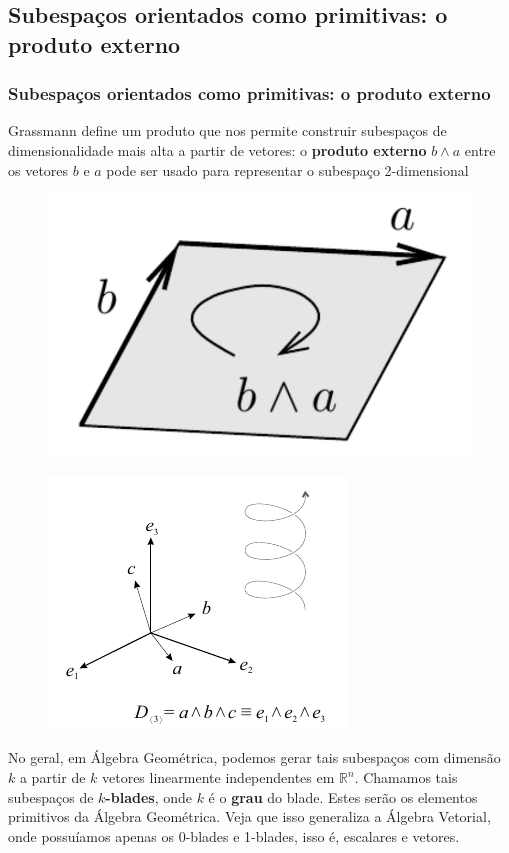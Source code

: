 \documentclass[10pt]{beamer}
\theoremstyle{plain}
\theoremstyle{definition}
\begin{document}
	\subsection{Subespaços orientados como primitivas: o produto externo}
	\begin{frame}
		\frametitle{Subespaços orientados como primitivas: o produto externo}
		
		Grassmann define um produto que nos permite construir subespaços de dimensionalidade mais alta a partir de vetores:
		o \textbf{produto externo} $b\wedge a$ entre os vetores $b$ e $a$ pode ser usado para representar o subespaço 2-dimensional
		\begin{figure}[H]
			\vspace{0.5cm}
			\hspace{-5cm}
			\includegraphics[width=0.3\linewidth]{figures/2blade2.pdf}
		\end{figure}
	
		\vspace{-3cm}
		\begin{figure}[H]
			\hspace{5cm}
			\includegraphics[width=0.3\linewidth]{figures/d3.png}
		\end{figure}
	
		No geral, em Álgebra Geométrica, podemos gerar tais subespaços com dimensão $k$ a partir de $k$ vetores linearmente independentes em $\mathbb{R}^n$. Chamamos tais subespaços de \textbf{$k$-blades}, onde $k$ é o \textbf{grau} do blade. Estes serão os elementos primitivos da Álgebra Geométrica. Veja que isso generaliza a Álgebra Vetorial, onde possuíamos apenas os 0-blades e 1-blades, isso é, escalares e vetores. 
	\end{frame}
\end{document}
